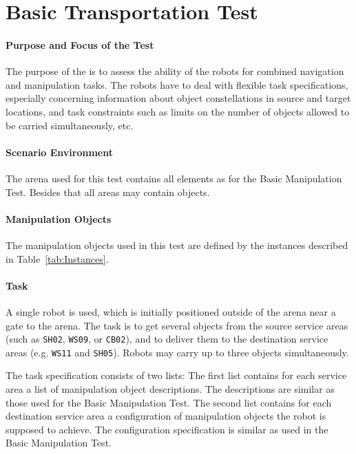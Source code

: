 \newpage
\section{Basic Transportation Test}

\paragraph{Purpose and Focus of the Test}
The purpose of the  is to assess the ability of the robots for combined navigation and manipulation tasks. 
The robots have to deal with flexible task specifications, especially concerning information about object constellations in source and target locations, and task constraints such as limits on the number of objects allowed to be carried simultaneously, etc.  

\paragraph{Scenario Environment}
The arena used for this test contains all elements as for the Basic Manipulation Test. Besides that all areas may contain objects.

\paragraph{Manipulation Objects}
The manipulation objects used in this test are defined by the instances described in Table~\ref{tab:Instances}.

\paragraph{Task}
A single robot is used, which is initially positioned outside of the arena near a gate to the arena. The task is to get several objects from the source service areas (such as \texttt{SH02}, \texttt{WS09}, or \texttt{CB02}), and to deliver them to the destination service areas (e.g. \texttt{WS11} and \texttt{SH05}). Robots may carry up to three objects simultaneously. 
\par
The task specification consists of two lists:
The first list contains for each service area a list of manipulation object descriptions. The descriptions are similar as those used for the Basic Manipulation Test. 
The second list contains for each destination service area a configuration of manipulation objects the robot is supposed to achieve. The configuration specification is similar as used in the Basic Manipulation Test. 

